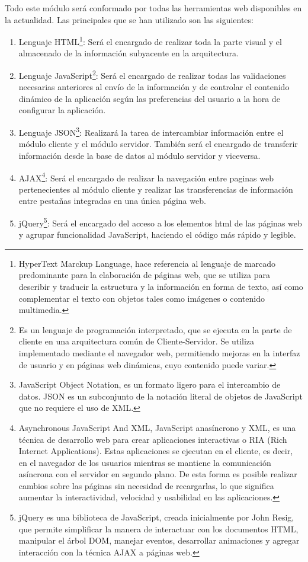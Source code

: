 \bigskip
\par 
Todo este módulo será conformado por todas las herramientas web disponibles en la actualidad. Las principales que se han utilizado son las siguientes:
\begin{enumerate}
\item Lenguaje HTML\footnote[1]{HyperText Marckup Language, hace referencia al lenguaje de marcado predominante para la elaboración de páginas web, que se utiliza para describir y traducir la estructura y la información en forma de texto, así como complementar el texto con objetos tales como imágenes o contenido multimedia.}: Será el encargado de realizar toda la parte visual y el almacenado de la información subyacente en la arquitectura.
\item Lenguaje JavaScript\footnote[2]{Es un lenguaje de programación interpretado, que se ejecuta en la parte de cliente en una arquitectura común de Cliente-Servidor. Se utiliza implementado mediante el navegador web, permitiendo mejoras en la interfaz de usuario y en páginas web dinámicas, cuyo contenido puede variar.}: Será el encargado de realizar todas las validaciones necesarias anteriores al envío de la información y de controlar el contenido dinámico de la aplicación según las preferencias del usuario a la hora de configurar la aplicación.
\item Lenguaje JSON\footnote[3]{JavaScript Object Notation, es un formato ligero para el intercambio de datos. JSON es un subconjunto de la notación literal de objetos de JavaScript que no requiere el uso de XML.}: Realizará la tarea de intercambiar información entre el módulo cliente y el módulo servidor. También será el encargado de transferir información desde la base de datos al módulo servidor y viceversa.
\item AJAX\footnote[4]{Asynchronous JavaScript And XML, JavaScript anasíncrono y XML, es una técnica de desarrollo web para crear aplicaciones interactivas o RIA (Rich Internet Applications). Estas aplicaciones se ejecutan en el cliente, es decir, en el navegador de los usuarios mientras se mantiene la comunicación asíncrona con el servidor en segundo plano. De esta forma es posible realizar cambios sobre las páginas sin necesidad de recargarlas, lo que significa aumentar la interactividad, velocidad y usabilidad en las aplicaciones.}: Será el encargado de realizar la navegación entre paginas web pertenecientes al módulo cliente y realizar las transferencias de información entre pestañas integradas en una única página web.
\item jQuery\footnote[5]{jQuery es una biblioteca de JavaScript, creada inicialmente por John Resig, que permite simplificar la manera de interactuar con los documentos HTML, manipular el árbol DOM, manejar eventos, desarrollar animaciones y agregar interacción con la técnica AJAX a páginas web.}: Será el encargado del acceso a los elementos html de las páginas web y agrupar funcionalidad JavaScript, haciendo el código más rápido y legible.

\end{enumerate}
